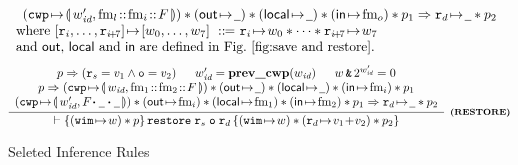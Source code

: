 \begin{figure*}[!thp]
{\begin{minipage}{1\linewidth}
\[\begin{array}{l}
{\begin{array}{c}
						\left(\frmst{\cwp'}
                                    {\fm_l \stCons \fm_i \stCons \Wstack}\right) *
						\Regs{\notCare}{\notCare}{\fm_o} * p_1
						\Rightarrow \regst{\reg{d}}{\notCare} * p_2
					\end{array}		
				}
            \\
            \text{where }[\reg{i},\dots,\reg{i\!+\!7}]\pto [\word_0,\dots,\word_7]
             \ \define \ \reg{i}\pto\word_0 * \dots * \reg{i\!+\!7}\pto\word_7 \\
            \mbox{and $\outRN$, $\localRN$ and $\inRN$ are defined in
            Fig.~\ref{fig:save and restore}.}
            \end{array}
			\]
%
%
%
			\[
				\infer[\tinybftext{(RESTORE)}]
				{
					\wfins{(\regst{\regwim}{\word}) * p}
					{\crestore \; \reg{s} \; \oexp \; \reg{d}}
					{(\regst{\regwim}{\word}) *
                       (\regst{\reg{d}}{\val_1 \!+\! \val_2}) * p_2}
				}
				{
					\begin{array}{c}
						p \Rightarrow
                           (\reg{s} = \val_1 \wedge \oexp = \val_2) \quad \; \;
						\cwp' = \postcwp(\cwp) \quad \; \;
						\word \,\bitAND\, 2^{\cwp'} = 0\\
						p \Rightarrow
						\left(\frmst{\cwp}
                                    {\fm_1 \stCons \fm_2\stCons \Wstack} \right) *
						(\OutRegs{\notCare})
                        * (\LocalRegs{\notCare}) * (\InRegs{\fm_i})
                        * p_1 \\
						\left(\frmst{\cwp'}{\Wstack
                                            \lstApp\, \notCare \,
                                            \lstApp\, \notCare}\right) *
						\Regs{\fm_i}{\fm_1}{\fm_2} * p_1 \Rightarrow
						\regst{\reg{d}}{\notCare} * p_2
					\end{array}
				}
			\]
		\end{minipage}
	}
	
	\caption{Seleted Inference Rules}
	\label{fig:Seleted Inference rules}
	\vspace{-0.2em}
\end{figure*}

